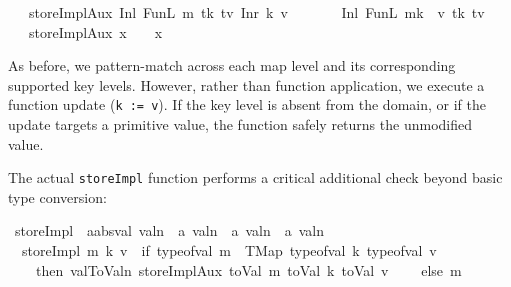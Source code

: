 \documentclass[11pt]{article}
\begin{document}
\begin{isabellebody}
\ \ {\isacharbar}{\kern0pt}\ {\isachardoublequoteopen}storeImplAux\ {\isacharparenleft}{\kern0pt}Inl\ {\isacharparenleft}{\kern0pt}FunL\ m\ tk\ tv{\isacharparenright}{\kern0pt}{\isacharparenright}{\kern0pt}\ {\isacharparenleft}{\kern0pt}Inr\ k{\isacharparenright}{\kern0pt}\ v\isanewline
\ \ \ \ \ \ {\isacharequal}{\kern0pt}\ {\isacharparenleft}{\kern0pt}Inl\ {\isacharparenleft}{\kern0pt}FunL\ {\isacharparenleft}{\kern0pt}m{\isacharparenleft}{\kern0pt}k\ {\isacharcolon}{\kern0pt}{\isacharequal}{\kern0pt}\ v{\isacharparenright}{\kern0pt}{\isacharparenright}{\kern0pt}\ tk\ tv{\isacharparenright}{\kern0pt}{\isacharparenright}{\kern0pt}{\isachardoublequoteclose}\isanewline
\ \ {\isacharbar}{\kern0pt}\ {\isachardoublequoteopen}storeImplAux\ x\ {\isacharunderscore}{\kern0pt}\ {\isacharunderscore}{\kern0pt}\ {\isacharequal}{\kern0pt}\ x{\isachardoublequoteclose}
\end{isabellebody}

As before, we pattern-match across each map level and its corresponding supported key levels.
However, rather than function application, we execute a function update (\texttt{k := v}).
If the key level is absent from the domain, or if the update targets a primitive value, the function safely returns the unmodified value.

The actual \texttt{storeImpl} function performs a critical additional check beyond basic type conversion:

\begin{isabellebody}
\isanewline
{}\isamarkupfalse%
\ storeImpl\ {\isacharcolon}{\kern0pt}{\isacharcolon}{\kern0pt}\ {\isachardoublequoteopen}{\isacharprime}{\kern0pt}a{\isacharcolon}{\kern0pt}{\isacharcolon}{\kern0pt}absval\ valn\ {\isasymRightarrow}\ {\isacharprime}{\kern0pt}a\ valn\ {\isasymRightarrow}\ {\isacharprime}{\kern0pt}a\ valn\ {\isasymRightarrow}\ {\isacharprime}{\kern0pt}a\ valn{\isachardoublequoteclose}\ \isanewline
\ \ {\isachardoublequoteopen}storeImpl\ m\ k\ v\ {\isacharequal}{\kern0pt}\ {\isacharparenleft}{\kern0pt}if\ type{\isacharunderscore}{\kern0pt}of{\isacharunderscore}{\kern0pt}val\ m\ {\isacharequal}{\kern0pt}\ TMap\ {\isacharparenleft}{\kern0pt}type{\isacharunderscore}{\kern0pt}of{\isacharunderscore}{\kern0pt}val\ k{\isacharparenright}{\kern0pt}\ {\isacharparenleft}{\kern0pt}type{\isacharunderscore}{\kern0pt}of{\isacharunderscore}{\kern0pt}val\ v{\isacharparenright}{\kern0pt}\isanewline
\ \ \ \ then\ val{}ToValn\ {\isacharparenleft}{\kern0pt}storeImplAux\ {\isacharparenleft}{\kern0pt}toVal{}{}{}{}\ m{\isacharparenright}{\kern0pt}\ {\isacharparenleft}{\kern0pt}toVal{}{}{}{}\ k{\isacharparenright}{\kern0pt}\ {\isacharparenleft}{\kern0pt}toVal{}{}{}{}\ v{\isacharparenright}{\kern0pt}{\isacharparenright}{\kern0pt}\isanewline
\ \ \ \ else\ m{\isacharparenright}{\kern0pt}{\isachardoublequoteclose}
\end{isabellebody}
\end{document}
